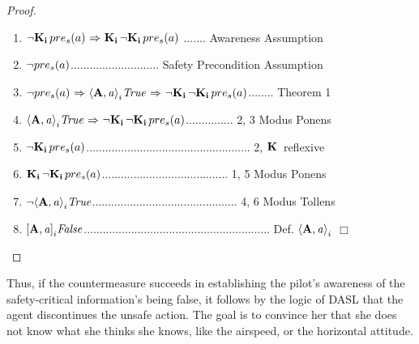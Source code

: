 \begin{proof}\mbox{}
	\begin{enumerate}
		\item ${\neg} \mathbf{K}_{\mathbf{i}}\, pre_s(a) {\ \Rightarrow \ } \mathbf{K}_{\mathbf{i}}\,{\neg} \mathbf{K}_{\mathbf{i}}\,pre_s(a)$ ....... Awareness Assumption
		\item ${\neg} pre_s(a)$............................ Safety Precondition Assumption
		\item ${\neg} pre_s(a) {\ \Rightarrow \ } \mathbf{\langle A, \mathit{a}\rangle}_i\mathit{True} {\ \Rightarrow \ } {\neg} \mathbf{K}_{\mathbf{i}}\,{\neg} \mathbf{K}_{\mathbf{i}}\,pre_s(a)$........ Theorem 1
		\item $\mathbf{\langle A, \mathit{a}\rangle}_i\mathit{True} {\ \Rightarrow \ } {\neg} \mathbf{K}_{\mathbf{i}}\,{\neg} \mathbf{K}_{\mathbf{i}}\,pre_s(a)$............... 2, 3 Modus Ponens
		\item ${\neg} \mathbf{K}_{\mathbf{i}}\,pre_s(a)$.................................................... 2, $\mathbf{K}\,$ reflexive
		\item $\mathbf{K}_{\mathbf{i}}\,{\neg}\mathbf{K}_{\mathbf{i}}\,pre_s(a)$........................................ 1, 5 Modus Ponens
		\item ${\neg} \mathbf{\langle A, \mathit{a}\rangle}_i\mathit{True}$.............................................. 4, 6 Modus Tollens
		\item $\mathbf{[A,\mathit{a}]}_i\mathit{False}$........................................................... Def. $\mathbf{\langle A,\mathit{a}\rangle}_i$  $\Box$
	\end{enumerate}
\end{proof}

Thus, if the countermeasure succeeds in establishing the pilot's awareness of the safety-critical information's being false, it follows by the logic of DASL that the agent discontinues the unsafe action. The goal is to convince her that she does not know what she thinks she knows, like the airspeed, or the horizontal attitude.

